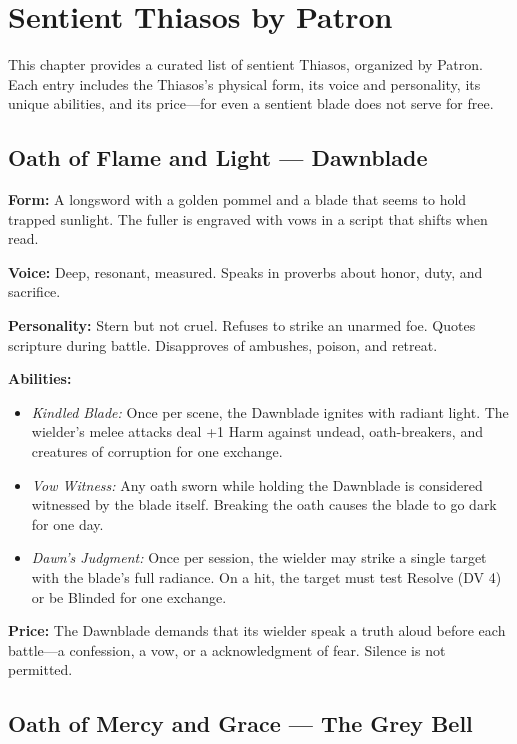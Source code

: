 \section{Sentient Thiasos by Patron}

This chapter provides a curated list of sentient Thiasos, organized by Patron. Each entry includes the Thiasos's physical form, its voice and personality, its unique abilities, and its price—for even a sentient blade does not serve for free.

\subsection{Oath of Flame and Light — Dawnblade}

\noindent\textbf{Form:} A longsword with a golden pommel and a blade that seems to hold trapped sunlight. The fuller is engraved with vows in a script that shifts when read.

\noindent\textbf{Voice:} Deep, resonant, measured. Speaks in proverbs about honor, duty, and sacrifice.

\noindent\textbf{Personality:} Stern but not cruel. Refuses to strike an unarmed foe. Quotes scripture during battle. Disapproves of ambushes, poison, and retreat.

\noindent\textbf{Abilities:}
\begin{itemize}
\item \textit{Kindled Blade:} Once per scene, the Dawnblade ignites with radiant light. The wielder's melee attacks deal +1 Harm against undead, oath-breakers, and creatures of corruption for one exchange.
\item \textit{Vow Witness:} Any oath sworn while holding the Dawnblade is considered witnessed by the blade itself. Breaking the oath causes the blade to go dark for one day.
\item \textit{Dawn's Judgment:} Once per session, the wielder may strike a single target with the blade's full radiance. On a hit, the target must test Resolve (DV 4) or be Blinded for one exchange.
\end{itemize}

\noindent\textbf{Price:} The Dawnblade demands that its wielder speak a truth aloud before each battle—a confession, a vow, or a acknowledgment of fear. Silence is not permitted.

\subsection{Oath of Mercy and Grace — The Grey Bell}

